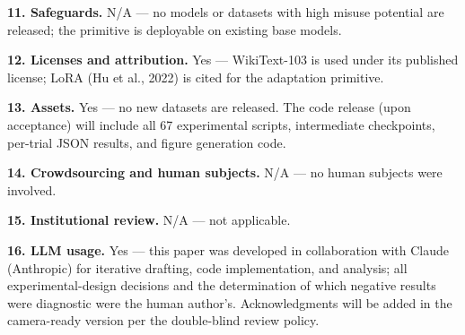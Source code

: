 \textbf{11. Safeguards.} N/A --- no models or datasets with high misuse potential are released; the primitive is deployable on existing base models.

\textbf{12. Licenses and attribution.} Yes --- WikiText-103 is used under its published license; LoRA (Hu et al., 2022) is cited for the adaptation primitive.

\textbf{13. Assets.} Yes --- no new datasets are released. The code release (upon acceptance) will include all 67 experimental scripts, intermediate checkpoints, per-trial JSON results, and figure generation code.

\textbf{14. Crowdsourcing and human subjects.} N/A --- no human subjects were involved.

\textbf{15. Institutional review.} N/A --- not applicable.

\textbf{16. LLM usage.} Yes --- this paper was developed in collaboration with Claude (Anthropic) for iterative drafting, code implementation, and analysis; all experimental-design decisions and the determination of which negative results were diagnostic were the human author's. Acknowledgments will be added in the camera-ready version per the double-blind review policy.
